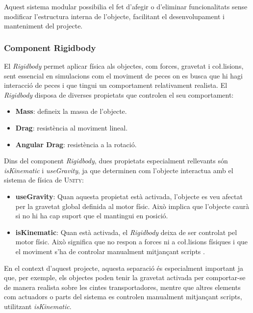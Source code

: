 \documentclass[a4paper,11pt,DIV=13,headings=normal,abstract=true,twoside=semi]{article}
\newcommand{\acro}[1]{\textsc{#1}}
\begin{document}
Aquest sistema modular possibilia el fet d'afegir o d'eliminar funcionalitats sense modificar l'estructura interna de l'objecte, facilitant el desenvolupament i manteniment del projecte.

\subsubsection{Component Rigidbody}

El \emph{Rigidbody} \cite{UnityRigidbody} permet aplicar física als objectes, com forces, gravetat i co\l.lisions, sent essencial en simulacions com el moviment de peces on es busca que hi hagi interacció de peces i que tingui un comportament relativament realista. El \emph{Rigidbody} disposa de diverses propietats que controlen el seu comportament:

\begin{itemize}
\item \textbf{Mass}: defineix la massa de l'objecte.
\item \textbf{Drag}: resistència al moviment lineal.
\item \textbf{Angular Drag}: resistència a la rotació.
\end{itemize}

Dins del component \emph{Rigidbody}, dues propietats especialment rellevants són \emph{isKinematic} i \emph{useGravity}, ja que determinen com l'objecte interactua amb el sistema de física de \acro{Unity}:

\begin{itemize}
    \item \textbf{useGravity}:  Quan aquesta propietat està activada, l'objecte es veu afectat per la gravetat global definida al motor físic. Això implica que l'objecte caurà si no hi ha cap suport que el mantingui en posició.
    \item \textbf{isKinematic}:  Quan està activada, el \emph{Rigidbody} deixa de ser controlat pel motor físic. Això significa que no respon a forces ni a co\l.lisions físiques i que el moviment s'ha de controlar manualment mitjançant scripts \cite{UnityRigidbody,UnityColliders}.
\end{itemize}

En el context d'aquest projecte, aquesta separació és especialment important ja que, per exemple, els objectes poden tenir la gravetat activada per comportar-se de manera realista sobre les cintes transportadores, mentre que altres elements com actuadors o parts del sistema es controlen manualment mitjançant scripts, utilitzant \emph{isKinematic}.
\end{document}
